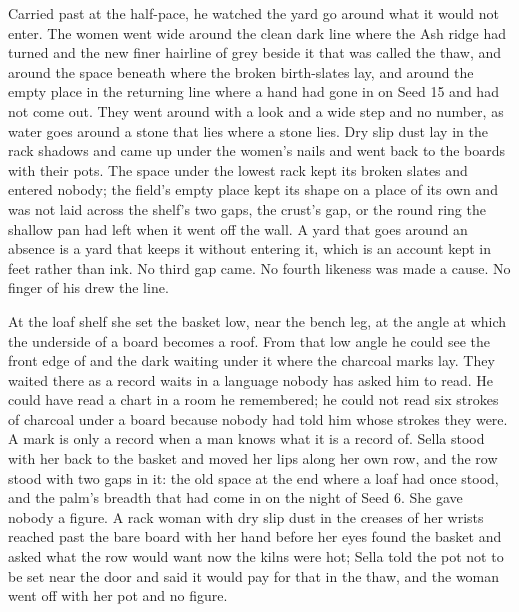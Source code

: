 \scenebreak

Carried past  at the half-pace, he watched the yard go around what it would not enter. The women went wide around the clean dark line where the Ash ridge had turned and the new finer hairline of grey beside it that was called the thaw, and around the space beneath  where the broken birth-slates lay, and around the empty place in the returning line where a hand had gone in on Seed 15 and had not come out. They went around with a look and a wide step and no number, as water goes around a stone that lies where a stone lies. Dry slip dust lay in the rack shadows and came up under the women’s nails and went back to the boards with their pots. The space under the lowest rack kept its broken slates and entered nobody; the field’s empty place kept its shape on a place of its own and was not laid across the shelf’s two gaps, the crust’s gap, or the round ring the shallow pan had left when it went off the wall. A yard that goes around an absence is a yard that keeps it without entering it, which is an account kept in feet rather than ink. No third gap came. No fourth likeness was made a cause. No finger of his drew the line.

At the loaf shelf she set the basket low, near the bench leg, at the angle at which the underside of a board becomes a roof. From that low angle he could see the front edge of  and the dark waiting under it where the charcoal marks lay. They waited there as a record waits in a language nobody has asked him to read. He could have read a chart in a room he remembered; he could not read six strokes of charcoal under a board because nobody had told him whose strokes they were. A mark is only a record when a man knows what it is a record of. Sella stood with her back to the basket and moved her lips along her own row, and the row stood with two gaps in it: the old space at the end where a loaf had once stood, and the palm’s breadth that had come in on the night of Seed 6. She gave nobody a figure. A rack woman with dry slip dust in the creases of her wrists reached past the bare board with her hand before her eyes found the basket and asked what the row would want now the kilns were hot; Sella told the pot not to be set near the door and said it would pay for that in the thaw, and the woman went off with her pot and no figure.

